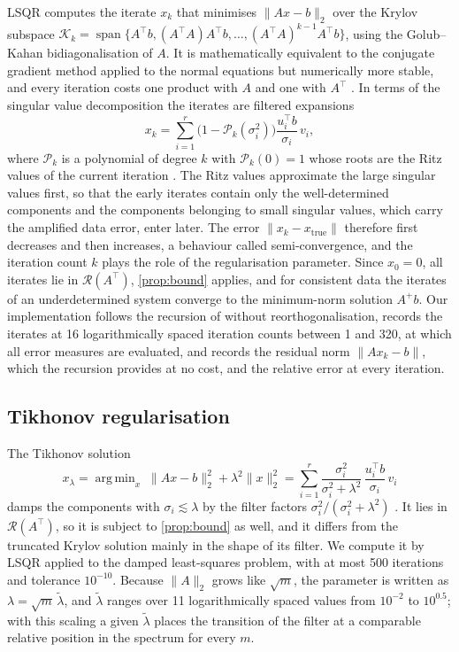 \documentclass[11pt,a4paper]{article}
\numberwithin{equation}{section}
\theoremstyle{remark}
\DeclareMathOperator*{\argmin}{arg\,min}
\newcommand{\RR}{\mathcal{R}}
\newcommand{\xt}{x_{\mathrm{true}}}
\newcommand{\T}{\top}
\begin{document}
LSQR \citep{paige1982} computes the iterate $x_k$ that minimises $\|Ax-b\|_2$ over the Krylov subspace $\mathcal K_k=\operatorname{span}\{A^\T b,(A^\T A)A^\T b,\dots,(A^\T A)^{k-1}A^\T b\}$, using the Golub--Kahan bidiagonalisation of $A$. It is mathematically equivalent to the conjugate gradient method applied to the normal equations but numerically more stable, and every iteration costs one product with $A$ and one with $A^\T$ \citep{bjorck1996}. In terms of the singular value decomposition the iterates are filtered expansions
\begin{equation}\label{eq:krylov-filter}
  x_k=\sum_{i=1}^r\bigl(1-\mathcal P_k(\sigma_i^2)\bigr)\frac{u_i^\T b}{\sigma_i}\,v_i ,
\end{equation}
where $\mathcal P_k$ is a polynomial of degree $k$ with $\mathcal P_k(0)=1$ whose roots are the Ritz values of the current iteration \citep{hanke1995,hansen2010}. The Ritz values approximate the large singular values first, so that the early iterates contain only the well-determined components and the components belonging to small singular values, which carry the amplified data error, enter later. The error $\|x_k-\xt\|$ therefore first decreases and then increases, a behaviour called semi-convergence, and the iteration count $k$ plays the role of the regularisation parameter. Since $x_0=0$, all iterates lie in $\RR(A^\T)$, \cref{prop:bound} applies, and for consistent data the iterates of an underdetermined system converge to the minimum-norm solution $A^+b$. Our implementation follows the recursion of \citep{paige1982} without reorthogonalisation, records the iterates at 16 logarithmically spaced iteration counts between 1 and 320, at which all error measures are evaluated, and records the residual norm $\|Ax_k-b\|$, which the recursion provides at no cost, and the relative error at every iteration.

\subsection{Tikhonov regularisation}\label{sec:methods-tik}

The Tikhonov solution
\begin{equation}\label{eq:tik}
  x_\lambda=\argmin_x\;\|Ax-b\|_2^2+\lambda^2\|x\|_2^2=\sum_{i=1}^r\frac{\sigma_i^2}{\sigma_i^2+\lambda^2}\,\frac{u_i^\T b}{\sigma_i}\,v_i
\end{equation}
damps the components with $\sigma_i\lesssim\lambda$ by the filter factors $\sigma_i^2/(\sigma_i^2+\lambda^2)$ \citep{engl1996,hansen2010}. It lies in $\RR(A^\T)$, so it is subject to \cref{prop:bound} as well, and it differs from the truncated Krylov solution mainly in the shape of its filter. We compute it by LSQR applied to the damped least-squares problem, with at most 500 iterations and tolerance $10^{-10}$. Because $\|A\|_2$ grows like $\sqrt m$, the parameter is written as $\lambda=\sqrt m\,\tilde\lambda$, and $\tilde\lambda$ ranges over 11 logarithmically spaced values from $10^{-2}$ to $10^{0.5}$; with this scaling a given $\tilde\lambda$ places the transition of the filter at a comparable relative position in the spectrum for every $m$.
\end{document}
